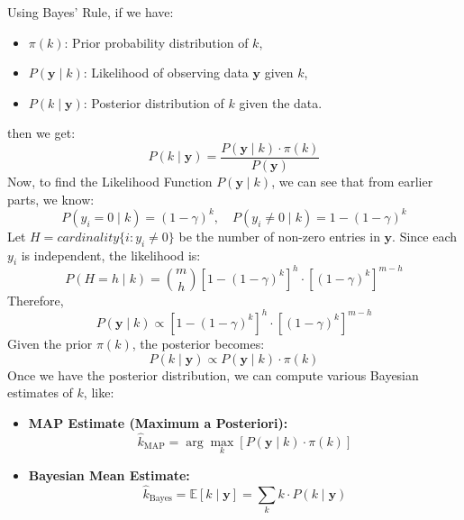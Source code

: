 \documentclass{article}
\begin{document}
\noindent
Using Bayes' Rule, if we have:
\begin{itemize}
    \item \(\pi(k)\): Prior probability distribution of \(k\),
    \item \(P(\boldsymbol{y} \mid k)\): Likelihood of observing data \(\boldsymbol{y}\) given \(k\),
    \item \(P(k \mid \boldsymbol{y})\): Posterior distribution of \(k\) given the data.
\end{itemize}
then we get:
\[
P(k \mid \boldsymbol{y}) = \frac{P(\boldsymbol{y} \mid k) \cdot \pi(k)}{P(\boldsymbol{y})}
\]
Now, to find the Likelihood Function \(P(\boldsymbol{y} \mid k)\), we can see that from earlier parts, we know:
\[
P(y_i = 0 \mid k) = (1 - \gamma)^k, \quad P(y_i \neq 0 \mid k) = 1 - (1 - \gamma)^k
\]
Let \(H = cardinality\{i : y_i \neq 0\}\) be the number of non-zero entries in \(\boldsymbol{y}\). Since each \(y_i\) is independent, the likelihood is:
\[
P(H = h \mid k) = \binom{m}{h} \left[1 - (1 - \gamma)^k\right]^h \cdot \left[(1 - \gamma)^k\right]^{m - h}
\]
Therefore,
\[
P(\boldsymbol{y} \mid k) \propto \left[1 - (1 - \gamma)^k\right]^h \cdot \left[(1 - \gamma)^k\right]^{m - h}
\]
Given the prior \(\pi(k)\), the posterior becomes:
\[
P(k \mid \boldsymbol{y}) \propto P(\boldsymbol{y} \mid k) \cdot \pi(k)
\]
Once we have the posterior distribution, we can compute various Bayesian estimates of \(k\), like:

\begin{itemize}
    \item \textbf{MAP Estimate (Maximum a Posteriori):}
    \[
    \hat{k}_{\text{MAP}} = \arg\max_k \left[ P(\boldsymbol{y} \mid k) \cdot \pi(k) \right]
    \]

    \item \textbf{Bayesian Mean Estimate:}
    \[
    \hat{k}_{\text{Bayes}} = \mathbb{E}[k \mid \boldsymbol{y}] = \sum_k k \cdot P(k \mid \boldsymbol{y})
    \]
\end{itemize}
\end{document}
